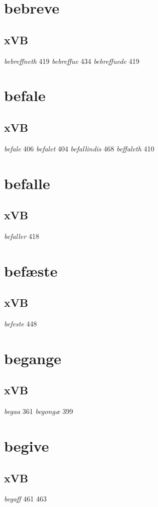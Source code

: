 \documentclass[a4paper,twocolumn]{article}
\begin{document}
\section{bebreve}
\label{sec:orge33a284}
\subsection{xVB}
\label{sec:org125a2a9}
\emph{bebreffneth} 419 \emph{bebreffue} 434 \emph{bebreffuede} 419 
\section{befale}
\label{sec:org42017c0}
\subsection{xVB}
\label{sec:orge246066}
\emph{befale} 406 \emph{befalet} 404 \emph{befallindis} 468 \emph{beffaleth} 410 
\section{befalle}
\label{sec:org99260a2}
\subsection{xVB}
\label{sec:org1fe9649}
\emph{befaller} 418 
\section{befæste}
\label{sec:orgef06e37}
\subsection{xVB}
\label{sec:orgfd3ec53}
\emph{befeste} 448 
\section{begange}
\label{sec:org64b821c}
\subsection{xVB}
\label{sec:org6815d8a}
\emph{begaa} 361 \emph{begongæ} 399 
\section{begive}
\label{sec:org7085a95}
\subsection{xVB}
\label{sec:org582b8e8}
\emph{begaff} 461 463 
\end{document}
